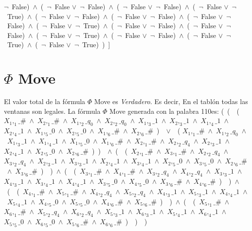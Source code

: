 ﻿\documentclass[a4paper,10pt]{article}
\begin{document}
$\neg$\ False)\ $\wedge$\ (\  $\neg$\ False $\vee$\  $\neg$\ False)\ $\wedge$\ (\  $\neg$\ False $\vee$\  $\neg$\ False)\ $\wedge$\ (\  $\neg$\ False $\vee$\  $\neg$\ True)\ $\wedge$\ (\  $\neg$\ False $\vee$\  $\neg$\ False)\ $\wedge$\ (\  $\neg$\ False $\vee$\  $\neg$\ False)\ $\wedge$\ (\  $\neg$\ False $\vee$\  $\neg$\ False)\ $\wedge$\ (\  $\neg$\ False $\vee$\  $\neg$\ True)\ $\wedge$\ (\  $\neg$\ False $\vee$\  $\neg$\ False)\ $\wedge$\ (\  $\neg$\ False $\vee$\  $\neg$\ False)\ $\wedge$\ (\  $\neg$\ False $\vee$\  $\neg$\ True)\ $\wedge$\ (\  $\neg$\ False $\vee$\  $\neg$\ False)\ $\wedge$\ (\  $\neg$\ False $\vee$\  $\neg$\ True)\ $\wedge$\ (\  $\neg$\ False $\vee$\  $\neg$\ True)\ )\ ]\  \newline \newline 
\section{$\Phi$ Move}
El valor total de la fórmula $\Phi$ Move es \emph{Verdadero}. Es decir, En el tablón todas las ventanas son legales. \newline \newline 
La fórmula $\Phi$ Move generada con la palabra 110es: \newline \newline 
(\ (\ \ (\ $X_1,_1\_\#$\ $\wedge$\ $X_2,_1\_\#$\ $\wedge$\ $X_1,_2\_q_0$\ $\wedge$\ $X_2,_2\_q_0$\ $\wedge$\ $X_1,_3\_1$\ $\wedge$\ $X_2,_3\_1$\ $\wedge$\ $X_1,_4\_1$\ $\wedge$\ $X_2,_4\_1$\ $\wedge$\ $X_1,_5\_0$\ $\wedge$\ $X_2,_5\_0$\ $\wedge$\ $X_1,_6\_\#$\ $\wedge$\ $X_2,_6\_\#$\ )\ \ $\vee$\ \ ( $X_1,_1\_\#$\ $\wedge$\ $X_1,_2\_q_0$\ $\wedge$\ $X_1,_3\_1$\ $\wedge$\ $X_1,_4\_1$\ $\wedge$\ $X_1,_5\_0$\ $\wedge$\ $X_1,_6\_\#$\ $\wedge$\ $X_2,_1\_\#$\ $\wedge$\ $X_2,_2\_q_4$\ $\wedge$\ $X_2,_3\_1$\ $\wedge$\ $X_2,_4\_1$\ $\wedge$\ $X_2,_5\_0$\ $\wedge$\ $X_2,_6\_\#$\  )\ )\ \ $\wedge$\ (\ \ (\ $X_2,_1\_\#$\ $\wedge$\ $X_3,_1\_\#$\ $\wedge$\ $X_2,_2\_q_4$\ $\wedge$\ $X_3,_2\_q_4$\ $\wedge$\ $X_2,_3\_1$\ $\wedge$\ $X_3,_3\_1$\ $\wedge$\ $X_2,_4\_1$\ $\wedge$\ $X_3,_4\_1$\ $\wedge$\ $X_2,_5\_0$\ $\wedge$\ $X_3,_5\_0$\ $\wedge$\ $X_2,_6\_\#$\ $\wedge$\ $X_3,_6\_\#$\ )\ \ )\ $\wedge$\ (\ \ (\ $X_3,_1\_\#$\ $\wedge$\ $X_4,_1\_\#$\ $\wedge$\ $X_3,_2\_q_4$\ $\wedge$\ $X_4,_2\_q_4$\ $\wedge$\ $X_3,_3\_1$\ $\wedge$\ $X_4,_3\_1$\ $\wedge$\ $X_3,_4\_1$\ $\wedge$\ $X_4,_4\_1$\ $\wedge$\ $X_3,_5\_0$\ $\wedge$\ $X_4,_5\_0$\ $\wedge$\ $X_3,_6\_\#$\ $\wedge$\ $X_4,_6\_\#$\ )\ \ )\ $\wedge$\ (\ \ (\ $X_4,_1\_\#$\ $\wedge$\ $X_5,_1\_\#$\ $\wedge$\ $X_4,_2\_q_4$\ $\wedge$\ $X_5,_2\_q_4$\ $\wedge$\ $X_4,_3\_1$\ $\wedge$\ $X_5,_3\_1$\ $\wedge$\ $X_4,_4\_1$\ $\wedge$\ $X_5,_4\_1$\ $\wedge$\ $X_4,_5\_0$\ $\wedge$\ $X_5,_5\_0$\ $\wedge$\ $X_4,_6\_\#$\ $\wedge$\ $X_5,_6\_\#$\ )\ \ )\ $\wedge$\ (\ \ (\ $X_5,_1\_\#$\ $\wedge$\ $X_6,_1\_\#$\ $\wedge$\ $X_5,_2\_q_4$\ $\wedge$\ $X_6,_2\_q_4$\ $\wedge$\ $X_5,_3\_1$\ $\wedge$\ $X_6,_3\_1$\ $\wedge$\ $X_5,_4\_1$\ $\wedge$\ $X_6,_4\_1$\ $\wedge$\ $X_5,_5\_0$\ $\wedge$\ $X_6,_5\_0$\ $\wedge$\ $X_5,_6\_\#$\ $\wedge$\ $X_6,_6\_\#$\ )\ \ )\ \ )\  \newline \newline 
\end{document}
